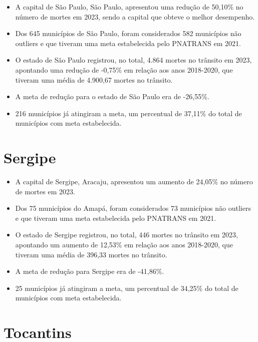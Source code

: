\documentclass[
  letterpaper,
  DIV=11,
  numbers=noendperiod]{scrreprt}
\begin{document}
\begin{itemize}
\item
  A capital de São Paulo, São Paulo, apresentou uma redução de 50,10\%
  no número de mortes em 2023, sendo a capital que obteve o melhor
  desempenho.
\item
  Dos 645 municípios de São Paulo, foram considerados 582 municípios não
  outliers e que tiveram uma meta estabelecida pelo PNATRANS em 2021.
\item
  O estado de São Paulo registrou, no total, 4.864 mortes no trânsito em
  2023, apontando uma redução de -0,75\% em relação aos anos 2018-2020,
  que tiveram uma média de 4.900,67 mortes no trânsito.
\item
  A meta de redução para o estado de São Paulo era de -26,55\%.
\item
  216 municípios já atingiram a meta, um percentual de 37,11\% do total
  de municípios com meta estabelecida.
\end{itemize}

\section{Sergipe}\label{sergipe}

\begin{itemize}
\item
  A capital de Sergipe, Aracaju, apresentou um aumento de 24,05\% no
  número de mortes em 2023.
\item
  Dos 75 municípios do Amapá, foram considerados 73 municípios não
  outliers e que tiveram uma meta estabelecida pelo PNATRANS em 2021.
\item
  O estado de Sergipe registrou, no total, 446 mortes no trânsito em
  2023, apontando um aumento de 12,53\% em relação aos anos 2018-2020,
  que tiveram uma média de 396,33 mortes no trânsito.
\item
  A meta de redução para Sergipe era de -41,86\%.
\item
  25 municípios já atingiram a meta, um percentual de 34,25\% do total
  de municípios com meta estabelecida.
\end{itemize}

\section{Tocantins}\label{tocantins}
\end{document}
